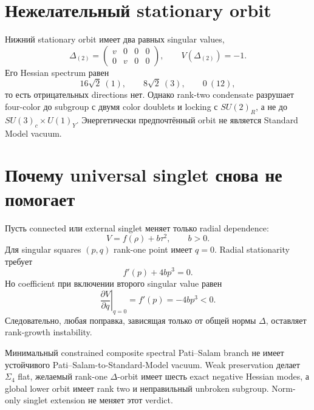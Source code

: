 \section{Нежелательный stationary orbit}

Нижний stationary orbit имеет два равных singular values,
\begin{equation}
 \Delta_{(2)}
 =\begin{pmatrix}v&0&0&0\\0&v&0&0\end{pmatrix},
 \qquad
 V(\Delta_{(2)})=-1.
\end{equation}
Его Hessian spectrum равен
\begin{equation}
 16\sqrt2\ (1),\qquad
 8\sqrt2\ (3),\qquad
 0\ (12),
\end{equation}
то есть отрицательных directions нет. Однако rank-two condensate разрушает
four-color до subgroup с двумя color doublets и locking с \(SU(2)_R\), а не
до \(SU(3)_c\times U(1)_Y\). Энергетически предпочтённый orbit не является
Standard Model vacuum.

\section{Почему universal singlet снова не помогает}

Пусть connected или external singlet меняет только radial dependence:
\begin{equation}
 V=f(\rho)+b\tau^2,
 \qquad b>0.
\end{equation}
Для singular squares \((p,q)\) rank-one point имеет \(q=0\). Radial
stationarity требует
\begin{equation}
 f'(p)+4bp^3=0.
\end{equation}
Но coefficient при включении второго singular value равен
\begin{equation}
 \left.\frac{\partial V}{\partial q}\right|_{q=0}
 =f'(p)=-4bp^3<0.
\end{equation}
Следовательно, любая поправка, зависящая только от общей нормы
\(\Delta\), оставляет rank-growth instability.

\begin{theorem}
Минимальный constrained composite spectral Pati--Salam branch не имеет
устойчивого Pati--Salam-to-Standard-Model vacuum. Weak preservation делает
\(\Sigma_4\) flat, желаемый rank-one \(\Delta\)-orbit имеет шесть exact
negative Hessian modes, а global lower orbit имеет rank two и неправильный
unbroken subgroup. Norm-only singlet extension не меняет этот verdict.
\end{theorem}

